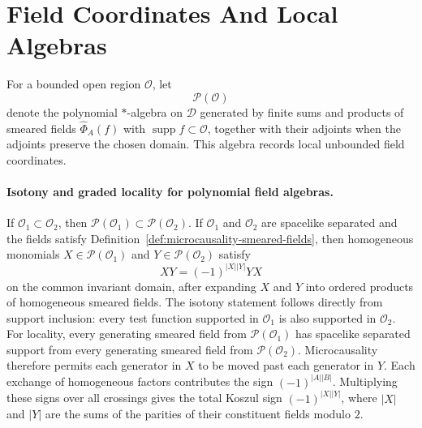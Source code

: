 \section{Field Coordinates And Local Algebras}

\begin{definition}
\label{def:local-polynomial-field-algebra}
For a bounded open region \(\mathcal O\), let
\[
  \mathcal P(\mathcal O)
\]
denote the polynomial \(*\)-algebra on \(\mathcal D\) generated by finite sums
and products of smeared fields \(\widehat\Phi_A(f)\) with
\(\operatorname{supp}f\subset\mathcal O\), together with their adjoints when
the adjoints preserve the chosen domain. This algebra records local unbounded
field coordinates.
\end{definition}

\paragraph{Isotony and graded locality for polynomial field algebras.}
If \(\mathcal O_1\subset\mathcal O_2\), then
\(\mathcal P(\mathcal O_1)\subset\mathcal P(\mathcal O_2)\). If
\(\mathcal O_1\) and \(\mathcal O_2\) are spacelike separated and the fields
satisfy Definition~\ref{def:microcausality-smeared-fields}, then homogeneous
monomials \(X\in\mathcal P(\mathcal O_1)\) and
\(Y\in\mathcal P(\mathcal O_2)\) satisfy
\[
  XY=(-1)^{|X||Y|}YX
\]
on the common invariant domain, after expanding \(X\) and \(Y\) into ordered
products of homogeneous smeared fields.
The isotony statement follows directly from support inclusion: every test
function supported in \(\mathcal O_1\) is also supported in \(\mathcal O_2\).
For locality, every generating smeared field from
\(\mathcal P(\mathcal O_1)\) has spacelike separated support from every
generating smeared field from \(\mathcal P(\mathcal O_2)\). Microcausality
therefore permits each generator in \(X\) to be moved past each generator in
\(Y\). Each exchange of homogeneous factors contributes the sign
\((-1)^{|A||B|}\). Multiplying these signs over all crossings gives the total
Koszul sign \((-1)^{|X||Y|}\), where \(|X|\) and \(|Y|\) are the sums of the
parities of their constituent fields modulo \(2\).

